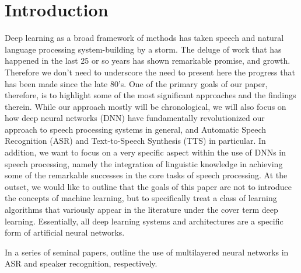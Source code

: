 \documentclass[12pt, titlepage, reqno]{article}
\begin{document}
\section{Introduction}
Deep learning as a broad framework of methods has taken speech and natural language processing system-building by a storm. The deluge of work that has happened in the last 25 or so years has shown remarkable promise, and growth. Therefore we don't need to underscore the need to present here the progress that has been made since the late 80's. One of the primary goals of our paper, therefore, is to highlight some of the most significant approaches and the findings therein. While our approach mostly will be chronological, we will also focus on how deep neural networks (DNN) have fundamentally revolutionized our approach to speech processing systems in general, and Automatic Speech Recognition (ASR) and Text-to-Speech Synthesis (TTS) in particular. In addition, we want to focus on a very specific aspect within the use of DNNs in speech processing, namely the integration of linguistic knowledge in achieving some of the remarkable successes in the core tasks of speech processing. At the outset, we would like to outline that the goals of this paper are not to introduce the concepts of machine learning, but to specifically treat a class of learning algorithms that variously appear in the literature under the cover term deep learning. Essentially, all deep learning systems and architectures are a specific form of artificial neural networks. 

In a series of seminal papers, \cite{bengio1989_acm,bengio1989} outline the use of multilayered neural networks in ASR and speaker recognition, respectively. 
\end{document}
